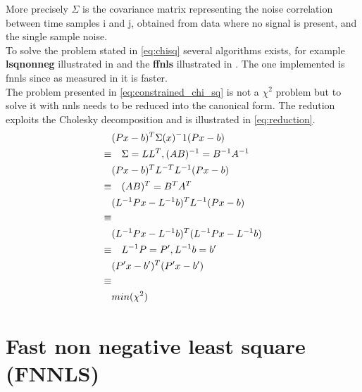 More precisely $\Sigma$ is the covariance matrix representing the noise correlation between time samples i and j, obtained from data where no signal is present, and the single sample noise.\\
To solve the problem stated in \ref{eq:chisq} several algorithms exists, for example \textbf{lsqnonneg} illustrated in \cite{nnls} and the \textbf{ffnls} illustrated in \cite{fnnls}. The one implemented is fnnls since as measured in \cite{Chen09nonnegativityconstraints} it is faster.\\
The problem presented in \ref{eq:constrained_chi_sq} is not a $\chi^2$ problem but to solve it with nnls needs to be reduced into the canonical form. The redution exploits the Cholesky decomposition and is illustrated in \ref{eq:reduction}.
\begin{equation}\label{eq:reduction}
  \begin{split}
  & (Px-b)^T\Sigma(x)^-1(Px-b)\\
  \equiv &\quad \Sigma=LL^T,\space (AB)^{-1} = B^{-1} A^{-1}\\
  & (Px-b)^T L^{-T} L^{-1} (Px-b)\\
  \equiv &\quad (AB)^T = B^T A^T \\
  & (L^{-1}Px-L^{-1}b)^T  L^{-1} (Px-b)\\
  \equiv & \\
  & (L^{-1}Px-L^{-1}b)^T (L^{-1}Px-L^{-1}b)\\
  \equiv &\quad L^{-1}P=P', \space L^{-1}b=b' \\
  & (P'x-b')^T(P'x-b')\\
  \equiv & \\
  & min(\chi^2)
  \end{split}
\end{equation}

\section{Fast non negative least square (FNNLS)}
